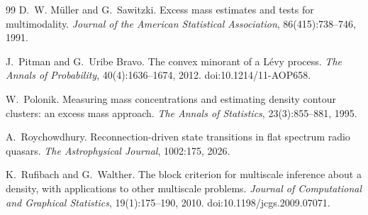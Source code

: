 \begin{thebibliography}{99}
 D.~W. Müller and G.~Sawitzki. Excess mass estimates and tests for multimodality. \emph{Journal of the American Statistical Association}, 86(415):738--746, 1991.

 J.~Pitman and G.~Uribe Bravo. The convex minorant of a Lévy process. \emph{The Annals of Probability}, 40(4):1636--1674, 2012. doi:10.1214/11-AOP658.

 W.~Polonik. Measuring mass concentrations and estimating density contour clusters: an excess mass approach. \emph{The Annals of Statistics}, 23(3):855--881, 1995.

 A.~Roychowdhury. Reconnection-driven state transitions in flat spectrum radio quasars. \emph{The Astrophysical Journal}, 1002:175, 2026.

 K.~Rufibach and G.~Walther. The block criterion for multiscale inference about a density, with applications to other multiscale problems. \emph{Journal of Computational and Graphical Statistics}, 19(1):175--190, 2010. doi:10.1198/jcgs.2009.07071.

\end{thebibliography}
